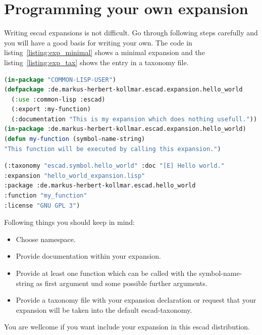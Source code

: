 \documentclass[a4paper, 12pt, openany]{scrbook}
\begin{document}
\section{Programming your own expansion}
Writing escad expansions is not difficult. Go through following steps carefully and you will have a good basis for writing your own. The code in listing~\ref{listing:exp_minimal} shows a minimal expansion and the listing~\ref{listing:exp_tax} shows the entry in a taxonomy file.
\begin{lstlisting}[caption={Minimal expansion code.}, language=Lisp, morekeywords={in-package, use}, label=listing:exp_minimal]
(in-package "COMMON-LISP-USER")
(defpackage :de.markus-herbert-kollmar.escad.expansion.hello_world
  (:use :common-lisp :escad)
  (:export :my-function)
  (:documentation "This is my expansion which does nothing usefull."))
(in-package :de.markus-herbert-kollmar.escad.expansion.hello_world)
(defun my-function (symbol-name-string)
"This function will be executed by calling this expansion.")
\end{lstlisting}
\begin{lstlisting}[caption={Entry in a taxonomy-file.}, language=Lisp, morekeywords={}, label=listing:exp_tax]
(:taxonomy "escad.symbol.hello_world" :doc "[E] Hello world."
:expansion "hello_world_expansion.lisp"
:package :de.markus-herbert-kollmar.escad.hello_world
:function "my_function"
:license "GNU GPL 3")
\end{lstlisting}
Following things you should keep in mind:
\begin{itemize}
\item Choose namespace.
\item Provide documentation within your expansion.
\item Provide at least one function which can be called with the symbol-name-string as first argument und some possible further arguments.
\item Provide a taxonomy file with your expansion declaration or request that your expansion will be taken into the default escad-taxonomy.
\end{itemize}
You are wellcome if you want include your expansion in this escad distribution.

\clearpage %

% 
\printindex


\end{document}
